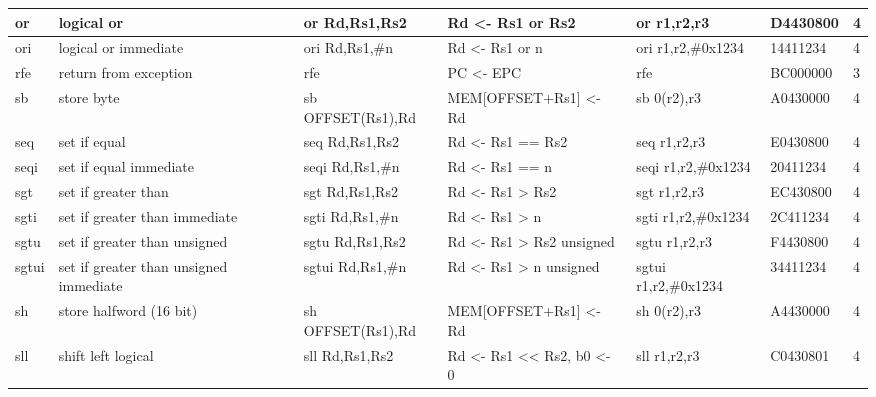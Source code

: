 \documentclass[a4paper,9pt]{extarticle}
\begin{document}
{\begin{tabular}{| p{0.6cm} | p{4cm} | p{3cm} | p{4cm} | p{3cm} | l | l | }
        or      & logical or                            & or Rd,Rs1,Rs2         & Rd <- Rs1 or Rs2                      & or r1,r2,r3                           & D4430800  & 4\\ \hline
        ori     & logical or immediate                  & ori Rd,Rs1,\#n        & Rd <- Rs1 or n                        & ori r1,r2,\#0x1234                    & 14411234  & 4\\ \hline
        rfe     & return from exception                 & rfe                   & PC <- EPC                             & rfe                                   & BC000000  & 3\\ \hline
        sb      & store byte                            & sb OFFSET(Rs1),Rd     & MEM[OFFSET+Rs1] <- Rd                 & sb 0(r2),r3                           & A0430000  & 4\\ \hline
        seq     & set if equal                          & seq Rd,Rs1,Rs2        & Rd <- Rs1 == Rs2                      & seq r1,r2,r3                          & E0430800  & 4\\ \hline
        seqi    & set if equal immediate                & seqi Rd,Rs1,\#n       & Rd <- Rs1 == n                        & seqi r1,r2,\#0x1234                   & 20411234  & 4\\ \hline
        sgt     & set if greater than                   & sgt Rd,Rs1,Rs2        & Rd <- Rs1 > Rs2                       & sgt r1,r2,r3                          & EC430800  & 4\\ \hline
        sgti    & set if greater than immediate         & sgti Rd,Rs1,\#n       & Rd <- Rs1 > n                         & sgti r1,r2,\#0x1234                   & 2C411234  & 4\\ \hline
        sgtu    & set if greater than unsigned          & sgtu Rd,Rs1,Rs2       & Rd <- Rs1 > Rs2 unsigned              & sgtu r1,r2,r3                         & F4430800  & 4\\ \hline
        sgtui   & set if greater than unsigned immediate& sgtui Rd,Rs1,\#n      & Rd <- Rs1 > n unsigned                & sgtui r1,r2,\#0x1234                  & 34411234  & 4\\ \hline
        sh      & store halfword (16 bit)               & sh OFFSET(Rs1),Rd     & MEM[OFFSET+Rs1] <- Rd                 & sh 0(r2),r3                           & A4430000  & 4\\ \hline
        sll     & shift left logical                    & sll Rd,Rs1,Rs2        & Rd <- Rs1 << Rs2, b0 <- 0             & sll r1,r2,r3                          & C0430801  & 4\\ \hline

\end{tabular}}
\end{document}
